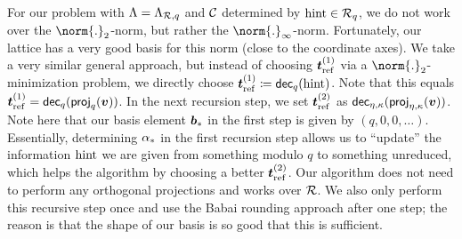 \begin{remark}
For our problem with $\Lambda = \Lambda_{\mathcal{R},q}$ and $\mathcal{C}$ determined by $\mathrm{hint}\in\mathcal{R}_q$, we do not work over the $\norm{.}_2$-norm, but rather the $\norm{.}_\infty$-norm. Fortunately, our lattice has a very good basis for this norm (close to the coordinate axes). We take a very similar general approach, but instead of choosing $\boldsymbol{t}_{\mathrm{ref}}^{(1)}$ via a $\norm{.}_2$-minimization problem, we directly choose $\boldsymbol{t}_{\mathrm{ref}}^{(1)} \coloneqq \mathsf{dec}_{q}(\mathrm{hint})$. Note that this equals $\boldsymbol{t}_{\mathrm{ref}}^{(1)}=\mathsf{dec}_{q}(\mathsf{proj}_{q}(\boldsymbol{v}))$. In the next recursion step, we set $\boldsymbol{t}_{\mathrm{ref}}^{(2)}$ as $\mathsf{dec}_{\eta,\kappa}(\mathsf{proj}_{\eta,\kappa}(\boldsymbol{v}))$. Note here that our basis element $\boldsymbol{b}_{\ast}$ in the first step is given by $(q,0,0,\ldots)$. Essentially, determining $\alpha_{\ast}$ in the first recursion step allows us to ``update'' the information $\mathrm{hint}$ we are given from something modulo $q$ to something unreduced, which helps the algorithm by choosing a better $\boldsymbol{t}_{\mathrm{ref}}^{(2)}$.
Our algorithm does not need to perform any orthogonal projections and works over $\mathcal{R}$. We also only perform this recursive step once and use the Babai rounding approach after one step; the reason is that the shape of our basis is so good that this is sufficient.






\end{remark}
